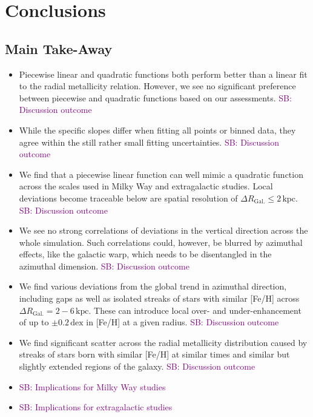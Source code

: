 \documentclass[fleqn,usenatbib]{mnras}
\newcommand{\SB}[1]{{\textcolor{purple}{SB: #1}}}
\begin{document}
\section{Conclusions}
\label{sec:conc}

\subsection{Main Take-Away}

\begin{itemize}
    \item Piecewise linear and quadratic functions both perform better than a linear fit to the radial metallicity relation. However, we see no significant preference between piecewise and quadratic functions based on our assessments. \SB{Discussion outcome}
    \item While the specific slopes differ when fitting all points or binned data, they agree within the still rather small fitting uncertainties. \SB{Discussion outcome}
    \item We find that a piecewise linear function can well mimic a quadratic function across the scales used in Milky Way and extragalactic studies. Local deviations become traceable below are spatial resolution of $\Delta R_\mathrm{Gal.} \leq 2\,\mathrm{kpc}$. \SB{Discussion outcome}
    \item We see no strong correlations of deviations in the vertical direction across the whole simulation. Such correlations could, however, be blurred by azimuthal effects, like the galactic warp, which needs to be disentangled in the azimuthal dimension. \SB{Discussion outcome}
    \item We find various deviations from the global trend in azimuthal direction, including gaps as well as isolated streaks of stars with similar [Fe/H] across $\Delta R_\mathrm{Gal.} = 2-6\,\mathrm{kpc}$. These can introduce local over- and under-enhancement of up to $\pm 0.2\,\mathrm{dex}$ in [Fe/H] at a given radius. \SB{Discussion outcome}
    \item We find significant scatter across the radial metallicity distribution caused by streaks of stars born with similar [Fe/H] at similar times and similar but slightly extended regions of the galaxy. \SB{Discussion outcome}
    \item \SB{Implications for Milky Way studies}
    \item \SB{Implications for extragalactic studies}
\end{itemize}
\end{document}
